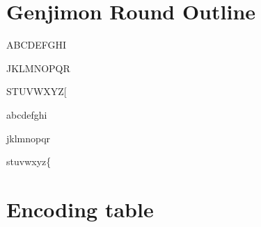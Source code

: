 \documentclass{mitsuba}
\begin{document}

\chapter{Genjimon Round Outline}

{
ABCDEFGHI

JKLMNOPQR

STUVWXYZ[

abcdefghi

jklmnopqr

stuvwxyz\{}

\clearpage


\twocolumn

\chapter{Encoding table}
\end{document}
